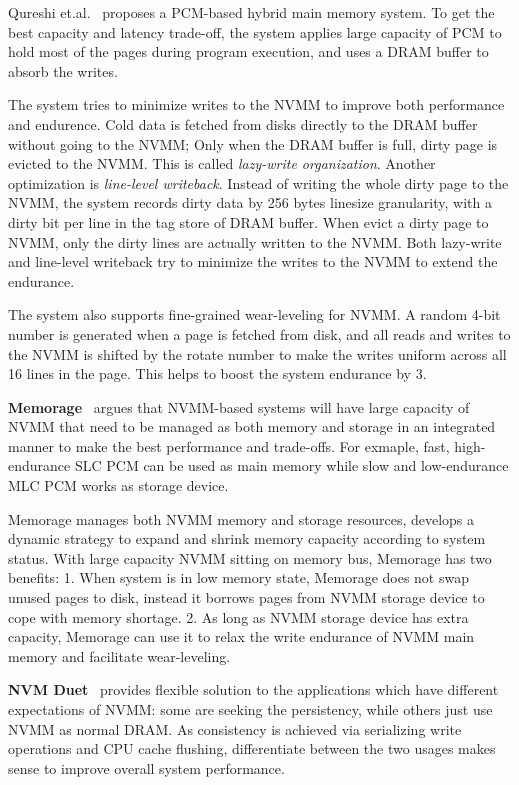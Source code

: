 Qureshi et.al.~\cite{PCMHierarchy} proposes a PCM-based hybrid main memory
system. To get the best capacity and latency trade-off, the system applies
large capacity of PCM to hold most of the pages during program execution,
and uses a DRAM buffer to absorb the writes. 

The system tries to minimize writes to the NVMM to improve both performance
and endurence. Cold data is fetched from disks directly to the DRAM buffer
without going to the NVMM; Only when the DRAM buffer is full, dirty page is 
evicted to the NVMM. This is called \emph{lazy-write organization}. Another
optimization is \emph{line-level writeback}. Instead of writing the whole dirty
page to the NVMM, the system records dirty data by 256 bytes linesize
granularity, with a dirty bit per line in the tag store of DRAM buffer.
When evict a dirty page to NVMM, only the dirty lines are actually written to
the NVMM. Both lazy-write and line-level writeback try to minimize the writes
to the NVMM to extend the endurance.

The system also supports fine-grained wear-leveling for NVMM. A random 4-bit 
number is generated when a page is fetched from disk, and all reads and writes
to the NVMM is shifted by the rotate number to make
the writes uniform across all 16 lines in the page.
This helps to boost the system endurance by 3\x{}.

\textbf{Memorage}~\cite{memorage} argues that NVMM-based systems will have large
capacity of NVMM that need to be managed as both memory and storage in
an integrated manner to make the best performance and trade-offs. For exmaple,
fast, high-endurance SLC PCM can be used as main memory
while slow and low-endurance MLC PCM works as storage device.

Memorage manages both NVMM memory and storage resources, develops a dynamic
strategy to expand and shrink memory capacity according to system status. 
With large capacity NVMM sitting on memory bus, Memorage has two benefits:
1. When system is in low memory state, Memorage does not swap unused pages
to disk, instead it borrows pages from NVMM storage device to cope with
memory shortage.
2. As long as NVMM storage device has extra capacity, Memorage can use it
to relax the write endurance of NVMM main memory and facilitate wear-leveling.

\textbf{NVM Duet}~\cite{duet} provides flexible solution to the applications
which
have different expectations of NVMM: some are seeking the persistency, while
others just use NVMM as normal DRAM. As consistency is achieved via serializing
write operations and CPU cache flushing, differentiate between the two usages
makes sense to improve overall system performance.

